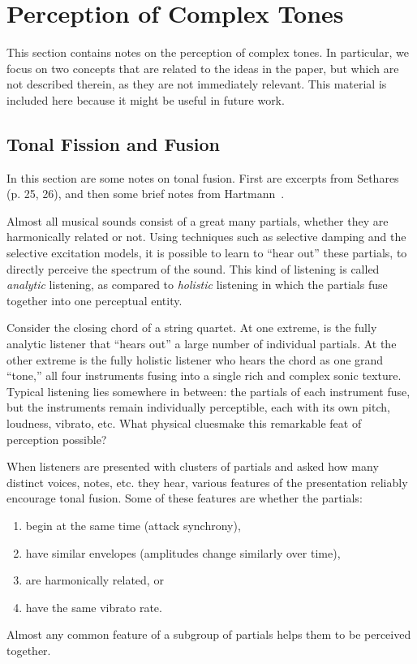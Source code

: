 \section{Perception of Complex Tones}
This section contains notes on the perception of complex tones.  In
particular, we focus on two concepts that are related to 
the ideas in the paper, but which are not described therein, as they
are not immediately relevant.  This material is included here because
it might be useful in future work. 
\subsection{Tonal Fission and Fusion} 
In this section are some notes on tonal fusion.  First are excerpts
from Sethares~\cite{Sethares:1997} (p. 25, 26), and then some brief notes
from Hartmann~\cite{Hartmann:1998}. 

Almost all musical sounds consist of a great many partials, whether they are
harmonically related or not.  Using techniques such as selective damping and
the selective excitation models, it is possible to learn to ``hear out'' these
partials, to directly perceive the spectrum of the sound.  This kind of
listening is called \emph{analytic} listening, as compared to \emph{holistic}
listening in which the partials fuse together into one perceptual entity.

Consider the closing chord of a string quartet.  At one extreme, is the fully
analytic listener that ``hears out'' a large number of individual partials.
At the other extreme is the fully holistic listener who hears the chord as one
grand ``tone,'' all four instruments fusing into a single rich and complex
sonic texture.  Typical listening lies somewhere in between: the partials of
each instrument fuse, but the instruments remain individually perceptible,
each with its own pitch, loudness, vibrato, etc.  What physical cluesmake this
remarkable feat of perception possible?

When listeners are presented with clusters of partials and asked how many
distinct voices, notes, etc. they hear, various features of the presentation
reliably encourage tonal fusion.  Some of these features are whether the
partials:
\begin{enumerate}
\item begin at the same time (attack synchrony),
\item have similar envelopes (amplitudes change similarly over time),
\item are harmonically related, or
\item have the same vibrato rate.
\end{enumerate}
Almost any common feature of a subgroup of partials helps them to be perceived
together. 


